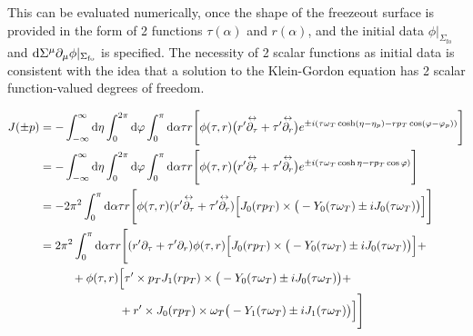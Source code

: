 This can be evaluated numerically, once the shape of the freezeout surface is provided in the form of 2 functions $\tau(\alpha)$ and $r(\alpha)$, and the initial data ${\phi\vert_{\Sigma_{\text{fo}}}}$ and ${\text{d}\Sigma^\mu\partial_\mu\phi\vert_{\Sigma_{\text{fo}}}}$ is specified. The necessity of 2 scalar functions as initial data is consistent with the idea that a solution to the Klein-Gordon equation has 2 scalar function-valued degrees of freedom.

\begin{subequations}
    \begin{align}
        J(\pm p) & =-\int_{-\infty}^\infty\text{d}\eta\int_0^{2\pi}\text{d}\varphi\int_0^\pi\text{d}\alpha\tau r\Bigg[\phi(\tau,r)\big(r^\prime\overset{\leftrightarrow}{\partial_\tau}+\tau^\prime\overset{\leftrightarrow}{\partial_r}\big)e^{\pm{i}(\tau \omega_T\cosh(\eta-\eta_p)-r p_T\cos(\varphi-\varphi_p))}\Bigg] \\
                           & =-\int_{-\infty}^\infty\text{d}\eta\int_0^{2\pi}\text{d}\varphi\int_0^\pi\text{d}\alpha\tau r\Bigg[\phi(\tau,r)\big(r^\prime\overset{\leftrightarrow}{\partial_\tau}+\tau^\prime\overset{\leftrightarrow}{\partial_r}\big)e^{\pm{i}(\tau \omega_T\cosh\eta-r p_T\cos\varphi)}\Bigg]                      \\
                           & =-2\pi^2\int_0^\pi\text{d}\alpha\tau r\Bigg[\phi(\tau,r)(r^\prime\overset{\leftrightarrow}{\partial_\tau}+\tau^\prime\overset{\leftrightarrow}{\partial_r})\Big[J_0(r p_T)\times\big(-Y_0(\tau\omega_T)\pm{i} J_0(\tau\omega_T)\big)\Big]\Bigg]                                                 \\
                           & =2\pi^2\int_0^\pi\text{d}\alpha\tau r\Bigg[(r^\prime\partial_\tau+\tau^\prime\partial_r)\phi(\tau,r)\Big[J_0(r p_T)\times\big(-Y_0(\tau\omega_T)\pm{i} J_0(\tau\omega_T)\big)\Big]+\nonumber                                                                                             \\
                           & \phantom{=}\qquad + \phi(\tau,r)\Big[\tau^\prime\times p_T J_1(r p_T)\times\big(-Y_0(\tau\omega_T)\pm{i} J_0(\tau\omega_T)\big)+\nonumber                                                                                                                                       \\
                           & \phantom{=}\qquad\phantom{+\phi(\tau,r)\Big[}+r^\prime\times J_0(r p_T)\times\omega_T\big(-Y_1(\tau\omega_T)\pm{i} J_1(\tau\omega_T)\big)\Big]\Bigg]
    \end{align}
\end{subequations}

